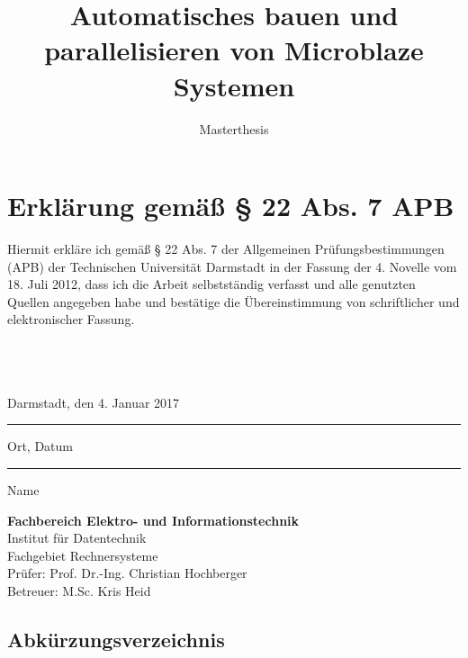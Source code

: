 \documentclass[accentcolor=tud1c,colorback,ngerman,12pt] {tudreport}
\begin{document}
\title{Automatisches bauen und parallelisieren von Microblaze Systemen}
\subtitle{Masterthesis}

\maketitle
\chapter*{Erklärung gemäß § 22 Abs. 7 APB}

Hiermit erkläre ich gemäß § 22 Abs. 7 der Allgemeinen Prüfungsbestimmungen (APB) der Technischen Universität Darmstadt in der Fassung der 4. Novelle vom 18. Juli 2012, dass ich die Arbeit selbstständig verfasst und alle genutzten Quellen angegeben habe und bestätige die Übereinstimmung von schriftlicher und elektronischer Fassung.\\ \\ \\ \\

\parbox{8cm}{\centering Darmstadt, den 4. Januar 2017\hrule
\strut \centering\footnotesize Ort, Datum} \hfill\parbox{8cm}{\phantom{Darmstadt, den 4. Januar 2017} \hrule
\strut \centering\footnotesize Name}

\vfill

\noindent \textbf{Fachbereich Elektro- und Informationstechnik}\\
Institut für Datentechnik\\
Fachgebiet Rechnersysteme\\
Prüfer: Prof. Dr.-Ing. Christian Hochberger\\
Betreuer: M.Sc. Kris Heid

\tableofcontents










\section*{Abkürzungsverzeichnis}
\begin{acronym}
 




\end{acronym}
\end{document}
